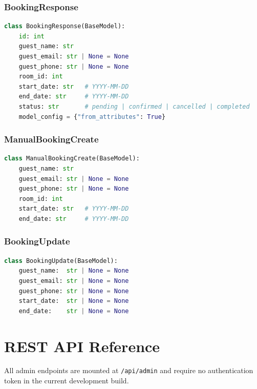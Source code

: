 \documentclass[12pt,a4paper]{report}
\begin{document}
\subsection{BookingResponse}

\begin{lstlisting}[language=Python, caption={BookingResponse DTO (admin/schemas.py)}]
class BookingResponse(BaseModel):
    id: int
    guest_name: str
    guest_email: str | None = None
    guest_phone: str | None = None
    room_id: int
    start_date: str   # YYYY-MM-DD
    end_date: str     # YYYY-MM-DD
    status: str       # pending | confirmed | cancelled | completed
    model_config = {"from_attributes": True}
\end{lstlisting}

\subsection{ManualBookingCreate}

\begin{lstlisting}[language=Python, caption={ManualBookingCreate DTO}]
class ManualBookingCreate(BaseModel):
    guest_name: str
    guest_email: str | None = None
    guest_phone: str | None = None
    room_id: int
    start_date: str   # YYYY-MM-DD
    end_date: str     # YYYY-MM-DD
\end{lstlisting}

\subsection{BookingUpdate}

\begin{lstlisting}[language=Python, caption={BookingUpdate DTO}]
class BookingUpdate(BaseModel):
    guest_name:  str | None = None
    guest_email: str | None = None
    guest_phone: str | None = None
    start_date:  str | None = None
    end_date:    str | None = None
\end{lstlisting}

\chapter{REST API Reference}

All admin endpoints are mounted at \texttt{/api/admin} and require no
authentication token in the current development build.
\end{document}
